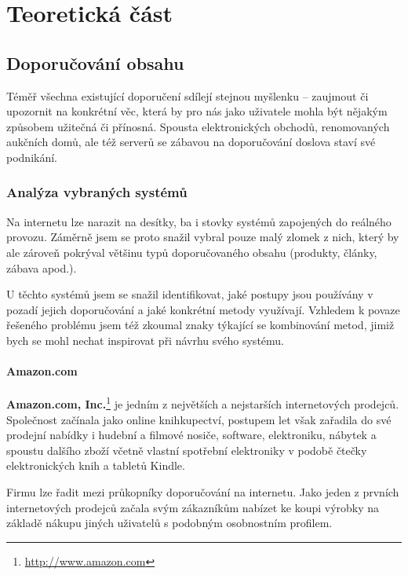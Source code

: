 \documentclass[thesis=M,czech]{FITthesis}[2014/05/07]
\begin{document}
\begin{introduction}
\end{introduction}

\chapter{Teoretická část}		
\label{chap:teor}

\section{Doporučování obsahu}	
\label{chap:current}

Téměř všechna existující doporučení sdílejí stejnou myšlenku – zaujmout či upozornit na konkrétní věc, která by pro nás jako uživatele mohla být nějakým způsobem užitečná či přínosná. Spousta elektronických obchodů, renomovaných aukčních domů, ale též serverů se zábavou na doporučování doslova staví své podnikání.

\subsection{Analýza vybraných systémů}
\label{sec:examples}
Na internetu lze narazit na desítky, ba i stovky systémů zapojených do reálného provozu. Záměrně jsem se proto snažil vybral pouze malý zlomek z nich, který by ale zároveň pokrýval většinu typů doporučovaného obsahu (produkty, články, zábava apod.).

U těchto systémů jsem se snažil identifikovat, jaké postupy jsou používány v pozadí jejich doporučování a jaké konkrétní metody využívají. Vzhledem k povaze řešeného problému jsem též zkoumal znaky týkající se kombinování metod, jimiž bych se mohl nechat inspirovat při návrhu svého systému.

\subsubsection{Amazon.com}

\textbf{Amazon.com, Inc.}\footnote{\url{http://www.amazon.com}} je jedním z největších a nejstarších internetových prodejců. Společnost začínala jako online knihkupectví, postupem let však zařadila do své prodejní nabídky i hudební a filmové nosiče, software, elektroniku, nábytek a spoustu dalšího zboží včetně vlastní spotřební elektroniky v podobě čtečky elektronických knih a tabletů Kindle.

Firmu lze řadit mezi průkopníky doporučování na internetu. Jako jeden z prvních internetových prodejců začala svým zákazníkům nabízet ke koupi výrobky na základě nákupu jiných uživatelů s podobným osobnostním profilem.
\end{document}
